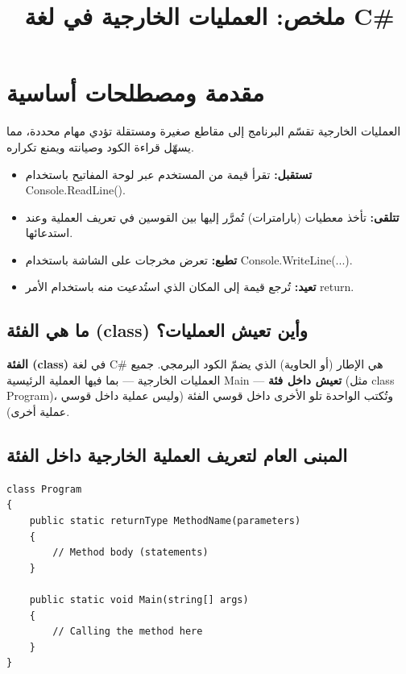 \documentclass[14pt]{extarticle}
\title{ملخص: العمليات الخارجية في لغة \textenglish{C\#}}
\begin{document}
\maketitle
\thispagestyle{fancy}

\section*{مقدمة ومصطلحات أساسية}
العمليات الخارجية تقسّم البرنامج إلى مقاطع صغيرة ومستقلة تؤدي مهام محددة، مما يسهّل قراءة الكود وصيانته ويمنع تكراره.

\begin{boxAttention}
\begin{itemize}[nosep]
    \item \textbf{تستقبل:} تقرأ قيمة من المستخدم عبر لوحة المفاتيح باستخدام \textenglish{Console.ReadLine()}.
    \item \textbf{تتلقى:} تأخذ معطيات (بارامترات) تُمرَّر إليها بين القوسين في تعريف العملية وعند استدعائها.
    \item \textbf{تطبع:} تعرض مخرجات على الشاشة باستخدام \textenglish{Console.WriteLine(...)}.
    \item \textbf{تعيد:} تُرجع قيمة إلى المكان الذي استُدعيت منه باستخدام الأمر \textenglish{return}.
\end{itemize}
\end{boxAttention}

\subsection*{ما هي الفئة (\textenglish{class}) وأين تعيش العمليات؟}
\textbf{الفئة (\textenglish{class})} في لغة \textenglish{C\#} هي الإطار (أو الحاوية) الذي يضمّ الكود البرمجي. جميع العمليات الخارجية — بما فيها العملية الرئيسية \textenglish{Main} — \textbf{تعيش داخل فئة} (مثل \textenglish{class Program})، وتُكتب الواحدة تلو الأخرى داخل قوسي الفئة (وليس عملية داخل قوسي عملية أخرى).

\subsection*{المبنى العام لتعريف العملية الخارجية داخل الفئة}
\begin{boxCode}
\begin{english}
\begin{verbatim}
class Program
{
    public static returnType MethodName(parameters)
    {
        // Method body (statements)
    }

    public static void Main(string[] args)
    {
        // Calling the method here
    }
}
\end{verbatim}
\end{english}
\end{boxCode}
\end{document}
